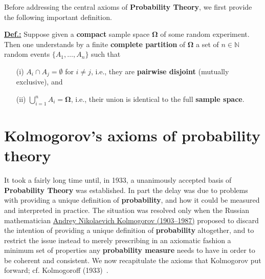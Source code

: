 \medskip
\noindent
Before addressing the central axioms of \textbf{Probability
Theory}, we first provide the following important definition.

\medskip
\noindent
\underline{\textbf{Def.:}} Suppose given a \textbf{compact} sample
space $\boldsymbol{\Omega}$ of some random experiment. Then one 
understands by a finite \textbf{complete partition} of 
$\boldsymbol{\Omega}$ a set of $n \in \mathbb{N}$ random events 
$\{A_{1}, \ldots, A_{n}\}$ such that
%
\begin{itemize}
\item[(i)] $A_{i} \cap A_{j} = \emptyset$ for $i \neq j$, i.e., 
they are \textbf{pairwise disjoint} (mutually exclusive), and 
\item[(ii)] $\displaystyle\bigcup_{i=1}^{n}A_{i} = 
\boldsymbol{\Omega}$, i.e., their union is identical to the full 
\textbf{sample space}.
\end{itemize}
%

\section[Kolmogorov's axioms of probability theory]{Kolmogorov's
axioms of probability theory}
It took a fairly long time until, in 1933, a unanimously accepted 
basis of \textbf{Probability Theory} was established. In part the 
delay was due to problems with providing a unique definition 
of \textbf{probability}, and how it could be measured and
interpreted in practice. The situation was resolved only when the
Russian mathematician
\href{http://www-history.mcs.st-and.ac.uk/Biographies/Kolmogorov.html}{Andrey Nikolaevich Kolmogorov (1903--1987)} proposed to discard 
the intention of providing a unique definition of
\textbf{probability} altogether, and to restrict the issue instead
to merely prescribing in an axiomatic fashion a minimum set of 
properties any \textbf{probability measure} needs to have 
in order to be coherent and consistent. We now recapitulate the 
axioms that Kolmogorov put forward; cf. Kolmogoroff 
(1933)~.

